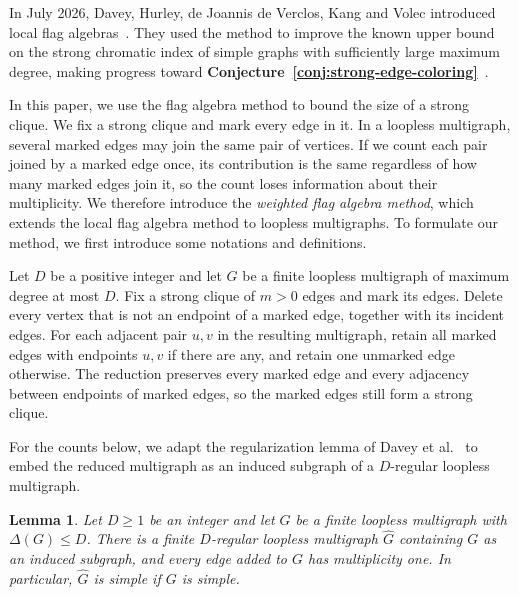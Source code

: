 \documentclass[preprint,11pt,numbers]{elsarticle-arxiv}
\numberwithin{equation}{section}
\newtheorem{lemma}[theorem]{Lemma}
\theoremstyle{definition}
\begin{document}
In July 2026, Davey, Hurley, de Joannis de Verclos, Kang and Volec
introduced local flag algebras~\cite{DaveyEtAlLocal2026}. They used
the method to improve the known upper bound on the strong chromatic
index of simple graphs with sufficiently large maximum degree,
making progress toward
\textbf{Conjecture~\ref{conj:strong-edge-coloring}}~\cite{DaveyEtAlStrong2026}.

In this paper, we use the flag algebra method to bound the size of
a strong clique. We fix a strong clique and mark every edge in it.
In a loopless multigraph, several marked edges may join the same pair
of vertices. If we count each pair joined by a marked edge once, its
contribution is the same regardless of how many marked edges join it,
so the count loses information about their multiplicity. We therefore
introduce the \emph{weighted flag algebra method}, which extends the
local flag algebra method to loopless multigraphs.
To formulate our method, we first introduce some notations and
definitions.

Let $D$ be a positive integer and let $G$ be a finite loopless
multigraph of maximum degree at most $D$. Fix a strong clique of
$m>0$ edges and mark its edges. Delete every vertex that is not an
endpoint of a marked edge, together with its incident edges. For each
adjacent pair $u,v$ in the resulting multigraph, retain all marked
edges with endpoints $u,v$ if there are any, and retain one unmarked
edge otherwise. The reduction preserves every marked edge and every
adjacency between endpoints of marked edges, so the marked edges
still form a strong clique.

For the counts below, we adapt the regularization lemma of
Davey et al.~\cite{DaveyEtAlStrong2026} to embed the reduced
multigraph as an induced subgraph of a $D$-regular loopless
multigraph.

\begin{lemma}\label{lem:regularization}
Let $D\geq1$ be an integer and let $G$ be a finite loopless
multigraph with $\Delta(G)\leq D$. There is a finite $D$-regular
loopless multigraph $\widehat G$ containing $G$ as an induced
subgraph, and every edge added to $G$ has multiplicity one. In
particular, $\widehat G$ is simple if $G$ is simple.
\end{lemma}
\end{document}
